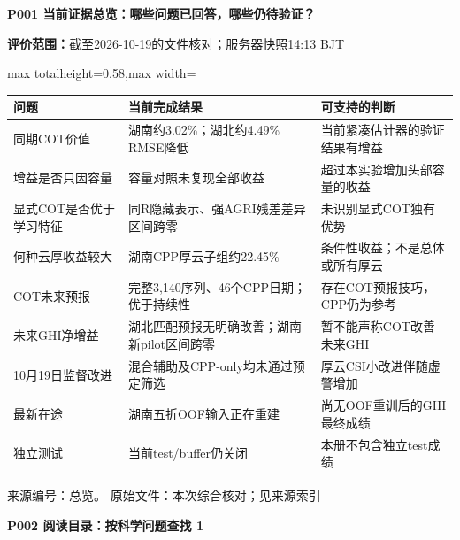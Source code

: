 \documentclass[UTF8,a4paper,landscape,10pt]{ctexart}
\begin{document}
{\large\bfseries\color{ink} P001  当前证据总览：哪些问题已回答，哪些仍待验证？}\par
{}\par
{\small\color{muted}\textbf{评价范围：}截至2026-10-19的文件核对；服务器快照14:13 BJT}\par\vspace{3mm}
\begin{center}\small
\begin{adjustbox}{max totalheight=0.58\textheight,max width=\linewidth}
\begin{minipage}{\linewidth}\begin{tabularx}{\linewidth}{>{\hsize=1.0000\hsize\raggedright\arraybackslash}X>{\hsize=1.0000\hsize\raggedright\arraybackslash}X>{\hsize=1.0000\hsize\raggedright\arraybackslash}X}\toprule
\textbf{问题} & \textbf{当前完成结果} & \textbf{可支持的判断} \\ \midrule
同期COT价值 & 湖南约3.02\%；湖北约4.49\% RMSE降低 & 当前紧凑估计器的验证结果有增益 \\
增益是否只因容量 & 容量对照未复现全部收益 & 超过本实验增加头部容量的收益 \\
显式COT是否优于学习特征 & 同R隐藏表示、强AGRI残差差异区间跨零 & 未识别显式COT独有优势 \\
何种云厚收益较大 & 湖南CPP厚云子组约22.45\% & 条件性收益；不是总体或所有厚云 \\
COT未来预报 & 完整3,140序列、46个CPP日期；优于持续性 & 存在COT预报技巧，CPP仍为参考 \\
未来GHI净增益 & 湖北匹配预报无明确改善；湖南新pilot区间跨零 & 暂不能声称COT改善未来GHI \\
10月19日监督改进 & 混合辅助及CPP-only均未通过预定筛选 & 厚云CSI小改进伴随虚警增加 \\
最新在途 & 湖南五折OOF输入正在重建 & 尚无OOF重训后的GHI最终成绩 \\
独立测试 & 当前test/\allowbreak{}buffer仍关闭 & 本册不包含独立test成绩 \\
\bottomrule\end{tabularx}\end{minipage}\end{adjustbox}\end{center}
\vfill{\scriptsize\color{muted} 来源编号：总览。 原始文件：本次综合核对；见来源索引}\par
\clearpage
{\large\bfseries\color{ink} P002  阅读目录：按科学问题查找 1}\par
\end{document}
